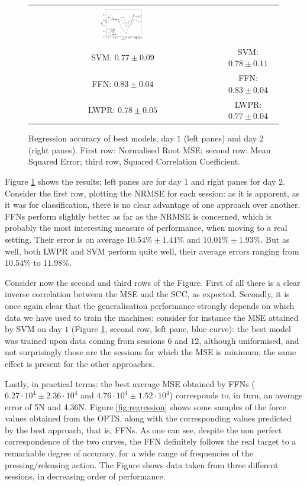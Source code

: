 \begin{figure}[!ht]
\begin{tabular}{cc}
    \includegraphics[width=0.25\textwidth]{figs/fig_SCC_regr_resCrossBestOnDay2.png} \\
     SVM: $0.77 \pm 0.09$ &  SVM: $0.78 \pm 0.11$ \\
     FFN: $0.83 \pm 0.04$ &  FFN: $0.83 \pm 0.04$ \\
    LWPR: $0.78 \pm 0.05$ & LWPR: $0.77 \pm 0.04$ \\
  \end{tabular}
  \caption{Regression accuracy of best models, day $1$ (left panes)
    and day $2$ (right panes). First row: Normalised Root MSE; second
    row: Mean Squared Error; third row, Squared Correlation Coefficient.}
  \label{fig:best_regr}
\end{figure}

Figure \ref{fig:best_regr} shows the results; left panes are for day
$1$ and right panes for day $2$. Consider the first row, plotting the
NRMSE for each session: as it is apparent, as it was for
classification, there is no clear advantage of one approach over
another. FFNs perform slightly better as far as the NRMSE is concerned,
which is probably the most interesting measure of performance, when
moving to a real setting. Their error is on average $10.54\% \pm
1.41\%$ and $10.01\% \pm 1.93\%$. But as well, both LWPR and SVM
perform quite well, their average errors ranging from $10.54\%$ to
$11.98\%$.

Consider now the second and third rows of the Figure. First of all
there is a clear inverse correlation between the MSE and the SCC, as
expected. Secondly, it is once again clear that the generalisation
performance strongly depends on which data we have used to train the
machines: consider for instance the MSE attained by SVM on day $1$
(Figure \ref{fig:best_regr}, second row, left pane, blue curve): the
best model was trained upon data coming from sessions $6$ and $12$,
although uniformised, and not surprisingly those are the sessions for
which the MSE is minimum; the same effect is present for the other
approaches.

Lastly, in practical terms: the best average MSE obtained by FFNs
($6.27\cdot 10^4 \pm 2.36\cdot 10^4$ and $4.76\cdot 10^4 \pm 1.52\cdot
10^4$) corresponds to, in turn, an average error of 5N and
4.36N. Figure \ref{fig:regression} shows some samples of the force
values obtained from the OFTS, along with the corresponding values
predicted by the best approach, that is, FFNs. As one can see, despite
the non perfect correspondence of the two curves, the FFN definitely
follows the real target to a remarkable degree of accuracy, for a wide
range of frequencies of the pressing/releasing action. The Figure
shows data taken from three different sessions, in decreasing order of
performance.

